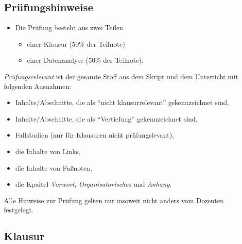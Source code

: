 \documentclass[12pt,ngerman,]{book}
\providecommand{\tightlist}{%
  \setlength{\itemsep}{0pt}\setlength{\parskip}{0pt}}
\theoremstyle{definition}
\theoremstyle{definition}
\theoremstyle{remark}
\begin{document}
\subsection{Prüfungshinweise}\label{prufungshinweise}

\begin{itemize}
\tightlist
\item
  Die Prüfung besteht aus zwei Teilen

  \begin{itemize}
  \tightlist
  \item
    einer Klausur (50\% der Teilnote)
  \item
    einer Datenanalyse (50\% der Teilnote).
  \end{itemize}
\end{itemize}

\emph{Prüfungsrelevant} ist der gesamte Stoff aus dem Skript und dem
Unterricht mit folgenden Ausnahmen:

\begin{itemize}
\tightlist
\item
  Inhalte/Abschnitte, die als ``nicht klausurrelevant'' gekennzeichnet
  sind,
\item
  Inhalte/Abschnitte, die als ``Vertiefung'' gekennzeichnet sind,
\item
  Fallstudien (nur für Klausuren nicht prüfungslevant),
\item
  die Inhalte von Links,
\item
  die Inhalte von Fußnoten,
\item
  die Kpaitel \emph{Vorwort}, \emph{Organisatorisches} und
  \emph{Anhang}.
\end{itemize}

Alle Hinweise zur Prüfung gelten nur insoweit nicht anders vom Dozenten
festgelegt.

\subsection{Klausur}\label{klausur}
\end{document}
